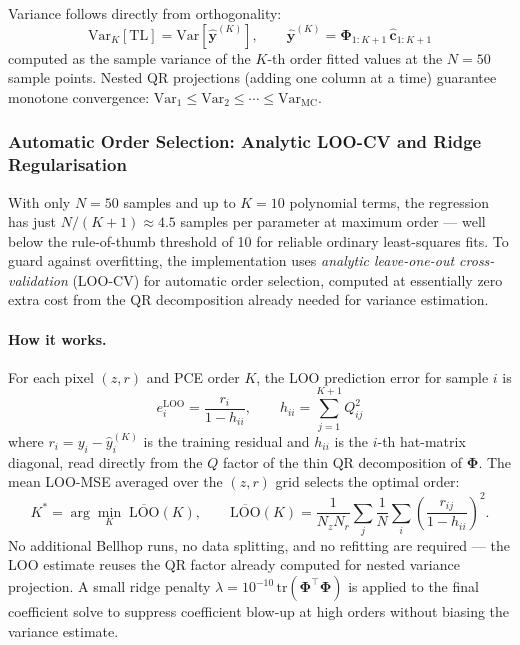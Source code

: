 \documentclass[11pt,a4paper]{article}
\newcommand{\Var}{\mathrm{Var}}
\newcommand{\TL}{\mathrm{TL}}
\begin{document}
Variance follows directly from orthogonality:
\begin{equation}
  \Var_K[\TL] = \mathrm{Var}\!\left[\hat{\mathbf{y}}^{(K)}\right], \qquad
  \hat{\mathbf{y}}^{(K)} = \boldsymbol\Phi_{1:K+1}\,\hat{\mathbf{c}}_{1:K+1}
  \label{eq:pce_var}
\end{equation}
computed as the sample variance of the $K$-th order fitted values at the $N=50$
sample points.
Nested QR projections (adding one column at a time) guarantee
monotone convergence: $\Var_1 \leq \Var_2 \leq \cdots \leq \Var_\text{MC}$.

\subsubsection{Automatic Order Selection: Analytic LOO-CV and Ridge Regularisation}
\label{sec:pce_loo}

With only $N=50$ samples and up to $K=10$ polynomial terms, the regression has just
$N/(K+1)\approx4.5$ samples per parameter at maximum order --- well below the rule-of-thumb
threshold of 10 for reliable ordinary least-squares fits.
To guard against overfitting, the implementation uses \emph{analytic leave-one-out
cross-validation} (LOO-CV) for automatic order selection, computed at essentially zero
extra cost from the QR decomposition already needed for variance estimation.

\paragraph{How it works.}
For each pixel $(z,r)$ and PCE order $K$, the LOO prediction error for sample $i$ is
\begin{equation}
  e_i^{\text{LOO}} = \frac{r_i}{1 - h_{ii}},
  \qquad h_{ii} = \sum_{j=1}^{K+1} Q_{ij}^2
  \label{eq:loo_impl}
\end{equation}
where $r_i = y_i - \hat{y}_i^{(K)}$ is the training residual and $h_{ii}$ is the
$i$-th hat-matrix diagonal, read directly from the $Q$ factor of the thin QR decomposition
of $\boldsymbol\Phi$.
The mean LOO-MSE averaged over the $(z,r)$ grid selects the optimal order:
\begin{equation}
  K^* = \arg\min_K \;\overline{\text{LOO}}(K),
  \qquad
  \overline{\text{LOO}}(K) = \frac{1}{N_z N_r}\sum_{j}\frac{1}{N}\sum_{i}
  \left(\frac{r_{ij}}{1-h_{ii}}\right)^{\!2}.
  \label{eq:loo_kstar}
\end{equation}
No additional Bellhop runs, no data splitting, and no refitting are required ---
the LOO estimate reuses the QR factor already computed for nested variance projection.
A small ridge penalty $\lambda = 10^{-10}\,\mathrm{tr}(\boldsymbol\Phi^\top\boldsymbol\Phi)$
is applied to the final coefficient solve to suppress coefficient blow-up at high orders
without biasing the variance estimate.
\end{document}
